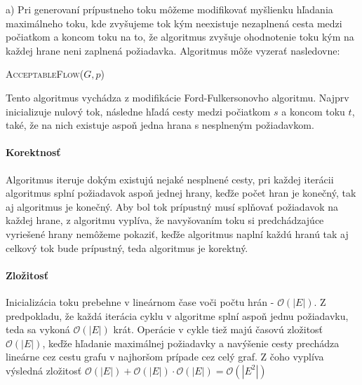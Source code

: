 \documentclass[12pt]{iv003}
\begin{document}
a) Pri generovaní prípustneho toku môžeme modifikovať myšlienku hľadania maximálneho toku, kde zvyšujeme tok kým neexistuje nezaplnená cesta medzi počiatkom a koncom toku na to, že algoritmus zvyšuje ohodnotenie toku kým na každej hrane neni zaplnená požiadavka. Algoritmus môže vyzerať nasledovne:

\begin{algorithm}[H]
	\caption{\textsc{AcceptableFlow}($G,p$)}
\end{algorithm}

Tento algoritmus vychádza z modifikácie Ford-Fulkersonovho algoritmu. Najprv inicializuje nulový tok, následne hľadá cesty medzi počiatkom $s$ a koncom toku $t$, také, že na nich existuje aspoň jedna hrana s nesplneným požiadavkom. 

\paragraph{Korektnosť}
Algoritmus iteruje dokým existujú nejaké nesplnené cesty, pri každej iterácii algoritmus splní požiadavok aspoň jednej hrany, keďže počet hran je konečný, tak aj algoritmus je konečný. Aby bol tok prípustný musí splňovať požiadavok na každej hrane, z algoritmu vyplíva, že navyšovaním toku si predchádzajúce vyriešené hrany nemôžeme pokaziť, keďže algoritmus naplní každú hranú tak aj celkový tok bude prípustný, teda algoritmus je korektný.

\paragraph{Zložitosť}
Inicializácia toku prebehne v lineárnom čase voči počtu hrán - $\mathcal{O}(|E|)$.
Z predpokladu, že každá iterácia cyklu v algoritme splní aspoň jednu požiadavku, teda sa vykoná $\mathcal{O}(|E|)$ krát. Operácie v cykle tiež majú časovú zložitosť $\mathcal{O}(|E|)$, keďže hľadanie maximálnej požiadavky a navýšenie cesty prechádza lineárne cez cestu grafu v najhoršom prípade cez celý graf. Z čoho vyplíva výsledná zložitosť $\mathcal{O}(|E|) + \mathcal{O}(|E|) \cdot \mathcal{O}(|E|) = \mathcal{O}(|E^{2}|)$\\
\end{document}
